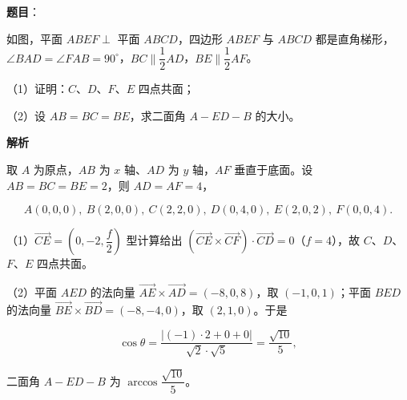 \begin{answer}

\textbf{题目}：

如图，平面 $ABEF\perp$ 平面 $ABCD$，四边形 $ABEF$ 与 $ABCD$ 都是直角梯形，$\angle BAD=\angle FAB=90^\circ$，$BC\parallel\dfrac12AD$，$BE\parallel\dfrac12AF$。

（1）证明：$C$、$D$、$F$、$E$ 四点共面；

（2）设 $AB=BC=BE$，求二面角 $A-ED-B$ 的大小。
\nopagebreak[4]
\begin{center}\end{center}
\nopagebreak[4]
\textbf{解析}

取 $A$ 为原点，$AB$ 为 $x$ 轴、$AD$ 为 $y$ 轴，$AF$ 垂直于底面。设 $AB=BC=BE=2$，则 $AD=AF=4$，

\nopagebreak[4]
\[A(0,0,0),\ B(2,0,0),\ C(2,2,0),\ D(0,4,0),\ E(2,0,2),\ F(0,0,4).\]

（1）$\overrightarrow{CE}=\left(0,-2,\dfrac f2\right)$ 型计算给出 $(\overrightarrow{CE}\times\overrightarrow{CF})\cdot\overrightarrow{CD}=0$（$f=4$），故 $C$、$D$、$F$、$E$ 四点共面。

（2）平面 $AED$ 的法向量 $\overrightarrow{AE}\times\overrightarrow{AD}=(-8,0,8)$，取 $(-1,0,1)$；平面 $BED$ 的法向量 $\overrightarrow{BE}\times\overrightarrow{BD}=(-8,-4,0)$，取 $(2,1,0)$。于是

\nopagebreak[4]
\[\cos\theta=\frac{|(-1)\cdot2+0+0|}{\sqrt2\cdot\sqrt5}=\frac{\sqrt{10}}5,\]

二面角 $A-ED-B$ 为 $\arccos\dfrac{\sqrt{10}}5$。


\end{answer}
